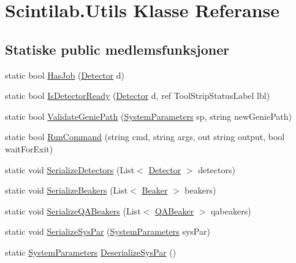\hypertarget{class_scintilab_1_1_utils}{\section{Scintilab.\+Utils Klasse Referanse}
\label{class_scintilab_1_1_utils}
}
\subsection*{Statiske public medlemsfunksjoner}
\begin{DoxyCompactItemize}
\item 
static bool \hyperlink{class_scintilab_1_1_utils_a7da6e6cb6b676052c7c4ba920cc8f48c}{Has\+Job} (\hyperlink{class_scintilab_1_1_detector}{Detector} d)
\item 
static bool \hyperlink{class_scintilab_1_1_utils_a0aeabad40511af66c860cd14cec8db81}{Is\+Detector\+Ready} (\hyperlink{class_scintilab_1_1_detector}{Detector} d, ref Tool\+Strip\+Status\+Label lbl)
\item 
static bool \hyperlink{class_scintilab_1_1_utils_a378bfc726339b637f2a1720948c49ddf}{Validate\+Genie\+Path} (\hyperlink{class_scintilab_1_1_system_parameters}{System\+Parameters} sp, string new\+Genie\+Path)
\item 
static bool \hyperlink{class_scintilab_1_1_utils_aea5aaee8604dc11611bf141608af6036}{Run\+Command} (string cmd, string args, out string output, bool wait\+For\+Exit)
\item 
static void \hyperlink{class_scintilab_1_1_utils_a3bb111cc5bc6d318bc3fe2425eb9fa6c}{Serialize\+Detectors} (List$<$ \hyperlink{class_scintilab_1_1_detector}{Detector} $>$ detectors)
\item 
static void \hyperlink{class_scintilab_1_1_utils_a87bc038d93a8b7b75686a945cc8ab82f}{Serialize\+Beakers} (List$<$ \hyperlink{class_scintilab_1_1_beaker}{Beaker} $>$ beakers)
\item 
static void \hyperlink{class_scintilab_1_1_utils_af4ef299132954898ae7f02c71d704f23}{Serialize\+Q\+A\+Beakers} (List$<$ \hyperlink{class_scintilab_1_1_q_a_beaker}{Q\+A\+Beaker} $>$ qabeakers)
\item 
static void \hyperlink{class_scintilab_1_1_utils_a1def7832ca47212a1d252c470572b234}{Serialize\+Sys\+Par} (\hyperlink{class_scintilab_1_1_system_parameters}{System\+Parameters} sys\+Par)
\item 
static \hyperlink{class_scintilab_1_1_system_parameters}{System\+Parameters} \hyperlink{class_scintilab_1_1_utils_a2c91464a40a656071e8c705a60d001f4}{Deserialize\+Sys\+Par} ()

\end{DoxyCompactItemize}
